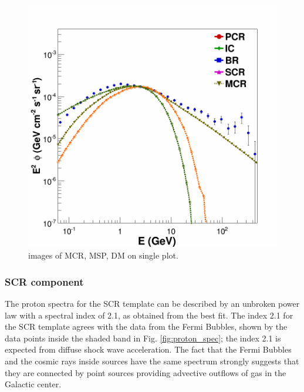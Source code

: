 \begin{figure}
 \centering
 \includegraphics[width=.9\linewidth]{pic/method/excess_comp.png}
 \caption{images of MCR, MSP, DM on single plot.}
 \label{fig:excess_component_comp}
\end{figure}

\subsubsection{SCR component}

The proton spectra for the SCR template can be described by an unbroken power law with a spectral index of 2.1, as obtained from the best fit. The index 2.1 for the SCR template agrees with the data from the Fermi Bubbles, shown by the data points inside the shaded band in Fig. \ref{fig:proton_spec}; the index 2.1 is expected from diffuse shock wave acceleration.  The fact that the Fermi Bubbles and the cosmic rays inside sources have the same spectrum strongly suggests that they are connected by point sources providing advective outflows of gas in the Galactic center. 



